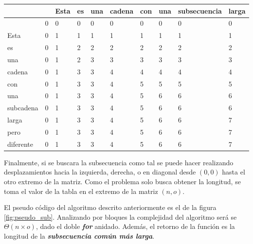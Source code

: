 \documentclass[12pt,twoside]{article}
\begin{document}
\begin{table}[ht]
\begin{tabular}{|l|l|l|l|l|l|l|l|l|l|}
\hline
          &   & Esta & es & una & cadena & con & una & subsecuencia & larga \\ \hline
          & 0 & 0    & 0  & 0   & 0      & 0   & 0   & 0            & 0     \\ \hline
Esta      & 0 & 1    & 1  & 1   & 1      & 1   & 1   & 1            & 1     \\ \hline
es        & 0 & 1    & 2  & 2   & 2      & 2   & 2   & 2            & 2     \\ \hline
una       & 0 & 1    & 2  & 3   & 3      & 3   & 3   & 3            & 3     \\ \hline
cadena    & 0 & 1    & 3  & 3   & 4      & 4   & 4   & 4            & 4     \\ \hline
con       & 0 & 1    & 3  & 3   & 4      & 5   & 5   & 5            & 5     \\ \hline
una       & 0 & 1    & 3  & 3   & 4      & 5   & 6   & 6            & 6     \\ \hline
subcadena & 0 & 1    & 3  & 3   & 4      & 5   & 6   & 6            & 6     \\ \hline
larga     & 0 & 1    & 3  & 3   & 4      & 5   & 6   & 6            & 7     \\ \hline
pero      & 0 & 1    & 3  & 3   & 4      & 5   & 6   & 6            & 7     \\ \hline
diferente & 0 & 1    & 3  & 3   & 4      & 5   & 6   & 6            & 7     \\ \hline
\end{tabular}
\end{table}

Finalmente, si se buscara la subsecuencia como tal se puede hacer realizando desplazamientos hacia la izquierda, derecha, o en diagonal desde $(0,0)$ hasta el otro extremo de la matriz. Como el problema solo busca obtener la longitud, se toma el valor de la tabla en el extremo de la matriz $(n,o)$.

El pseudo c\'odigo del algoritmo descrito anteriormente es el de la figura \ref{fig:pseudo_sub}. Analizando por bloques la complejidad del algoritmo ser\'a se $\Theta(n \times o)$, dado el doble \textit{\textbf{for}} anidado. Adem\'as, el retorno de la funci\'on es la longitud de la \textit{\textbf{subsecuencia com\'un m\'as larga}}.
\end{document}
